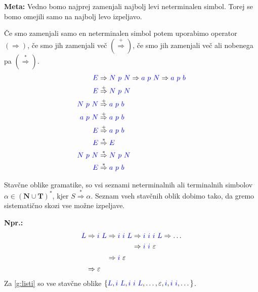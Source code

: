 \documentclass{article}
\newcommand{\Ex}{\textbf{Npr.:}\ }
\newcommand{\Special}[1]{\textbf{#1}}
\newcommand{\Set}[1]{\mathbf{#1}}
\newcommand{\Symbol}[1]{\textcolor{blue}{#1}}
\newcommand{\Terminals}{\Set{T}}
\newcommand{\NonTerminals}{\Set{N}}
\newcommand{\StartSymbol}{S}
\newcommand{\Null}{\varepsilon}
\newcommand{\Derive}{\Rightarrow}
\newcommand{\DeriveStar}{\overset{\ast}{\Rightarrow}}
\newcommand{\DerivePlus}{\overset{+}{\Rightarrow}}
\newcommand{\Seq}{\ }
\newcommand{\Kleene}[1]{#1^\ast}
\begin{document}
\Special{Meta:} Vedno bomo najprej zamenjali najbolj levi neterminalen simbol. Torej se bomo omejili samo na najbolj levo izpeljavo.

Če smo zamenjali samo en neterminalen simbol potem uporabimo operator $(\Derive)$, če smo jih zamenjali več $(\DerivePlus)$, če smo jih zamenjali več ali nobenega pa $(\DeriveStar)$.
  \begin{align*}
    \Symbol{E} &\Derive \Symbol{N} \Seq \Symbol{p} \Seq \Symbol{N} \Derive \Symbol{a} \Seq \Symbol{p} \Seq \Symbol{N} \Derive \Symbol{a} \Seq \Symbol{p} \Seq \Symbol{b} \\
    \Symbol{E} &\DerivePlus \Symbol{N} \Seq \Symbol{p} \Seq \Symbol{N}\\
    \Symbol{N} \Seq \Symbol{p} \Seq \Symbol{N} &\DerivePlus \Symbol{a} \Seq \Symbol{p} \Seq \Symbol{b}\\
    \Symbol{a} \Seq \Symbol{p} \Seq \Symbol{N} &\DerivePlus \Symbol{a} \Seq \Symbol{p} \Seq \Symbol{b}\\
    \Symbol{E} &\DerivePlus \Symbol{a} \Seq \Symbol{p} \Seq \Symbol{b}\\
    \Symbol{E} &\DeriveStar \Symbol{E}\\
    \Symbol{N} \Seq \Symbol{p} \Seq \Symbol{N} &\DeriveStar \Symbol{N} \Seq \Symbol{p} \Seq \Symbol{N}\\
    \Symbol{E} &\DeriveStar \Symbol{a} \Seq \Symbol{p} \Seq \Symbol{b}
  \end{align*}

Stavčne oblike gramatike, so vsi seznami neterminalnih ali terminalnih simbolov $\alpha \in \Kleene{(\NonTerminals \cup \Terminals)}$, kjer $\StartSymbol \DeriveStar \alpha$.
Seznam vseh stavčnih oblik dobimo tako, da gremo sistematično skozi vse možne izpeljave.

\Ex
  \begin{equation*}
    \Symbol{L} \begin{aligned}[t]
      &\Derive \Symbol{i} \Seq \Symbol{L} \begin{aligned}[t]
        &\Derive \Symbol{i} \Seq \Symbol{i} \Seq \Symbol{L} \begin{aligned}[t]
          &\Derive \Symbol{i} \Seq \Symbol{i} \Seq \Symbol{i} \Seq \Symbol{L} \Derive \dots\\
          &\Derive \Symbol{i} \Seq \Symbol{i} \Seq \Null 
        \end{aligned}\\
        &\Derive \Symbol{i} \Seq \Null 
      \end{aligned}\\
      &\Derive \Null
    \end{aligned}
  \end{equation*}
Za \ref{g:listi} so vse stavčne oblike $\{\Symbol{L}, \Symbol{i} \Seq \Symbol{L}, \Symbol{i} \Seq \Symbol{i} \Seq \Symbol{L}, \dots, \Null, \Symbol{i}, \Symbol{i} \Seq \Symbol{i}, \dots\}$.
\end{document}
